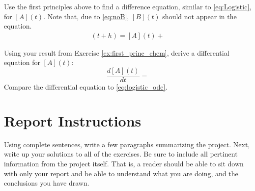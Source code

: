 \problemfont
\problem\label{ex:first_princ_chem} Use the first principles above to
find a difference equation, similar to \eqref{eq:Logistic}, for
$[A](t)$.  Note that, due to \eqref{eq:noB}, $[B](t)$ should not
appear in the equation.
\begin{align*}
  [A](t+h) = [A](t)
  +%
\end{align*}


\problem Using your result from Exercise \ref{ex:first_princ_chem},
derive a differential equation for $[A](t)$:
\[
\frac{d[A](t)}{dt}
=%
\]
Compare the differential equation to \eqref{eq:logistic_ode}.
\noproblemfont

\bigskip

\section*{Report Instructions} Using complete sentences, write a few
paragraphs summarizing the project.  Next, write up your solutions to
all of the exercises.  Be sure to include all pertinent information
from the project itself.  That is, a reader should be able to sit down
with only your report and be able to understand what you are doing,
and the conclusions you have drawn.



